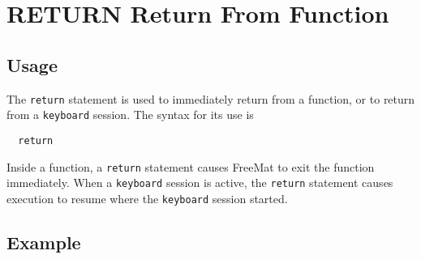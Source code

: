 \section{RETURN Return From Function}

\subsection{Usage}

The \verb|return| statement is used to immediately return from
a function, or to return from a \verb|keyboard| session.  The 
syntax for its use is
\begin{verbatim}
  return
\end{verbatim}
Inside a function, a \verb|return| statement causes FreeMat
to exit the function immediately.  When a \verb|keyboard| session
is active, the \verb|return| statement causes execution to
resume where the \verb|keyboard| session started.
\subsection{Example}


